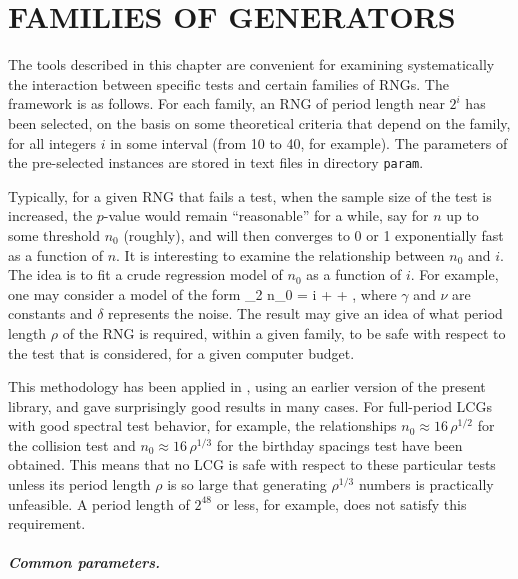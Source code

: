 \chapter {FAMILIES OF GENERATORS}

\def\eps  {$\epsilon\quad$}
\def\epsm  {--$\epsilon_1\quad$}

The tools described in this chapter are convenient for examining
systematically the interaction between specific tests
and certain families of RNGs.
The framework is as follows.
For each family, an RNG of period length near $2^i$ has been selected,
on the basis on some theoretical criteria
that depend on the family, for all integers $i$ in some interval
(from 10 to 40, for example).
The parameters of the pre-selected instances are stored in text files
in directory {\tt param}.

Typically, for a given RNG that fails a test, when the
sample size of the test is increased, the $p$-value would remain
``reasonable'' for a while, say  for $n$ up to some
threshold $n_0$ (roughly), and will then converges to 0 or 1 exponentially
fast as a function of $n$.
It is interesting to examine the relationship between $n_0$ and $i$.
The idea is to fit a crude regression model of $n_0$ as a function
of $i$.  For example, one may consider a model of the form
\eq
  \log_2 n_0 = \gamma i + \nu + \delta,
\endeq
where $\gamma$ and $\nu$ are constants and $\delta$ represents
the noise. The result may give an idea of what period length $\rho$
of the RNG is required, within a given family, to be safe with respect
to the test that is considered, for a given computer budget.

This methodology has been applied in
\cite{rGRA01a,rLEC98h,rLEC00c,rLEC01a,rLEC02c,rLEC03c},
using an earlier version of the present library,
and gave surprisingly good results in many cases.
For full-period LCGs with good spectral test behavior, for example,
the relationships $n_0 \approx 16\,\rho^{1/2}$
for the collision test and $n_0 \approx 16\,\rho^{1/3}$
for the birthday spacings test have been obtained.
This means that no LCG is safe with respect to these particular tests
unless its period length $\rho$ is so large that generating
$\rho^{1/3}$ numbers is practically unfeasible.
A period length of $2^{48}$ or less, for example, does not satisfy
this requirement.


\paragraph*{Common parameters.} \


